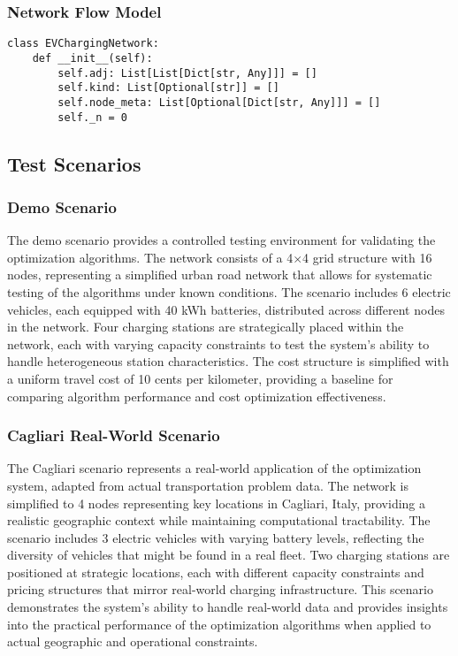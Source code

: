 \documentclass[12pt,a4paper]{article}
\begin{document}
\subsubsection{Network Flow Model}
\begin{lstlisting}[caption=Residual Network Structure]
class EVChargingNetwork:
    def __init__(self):
        self.adj: List[List[Dict[str, Any]]] = []
        self.kind: List[Optional[str]] = []
        self.node_meta: List[Optional[Dict[str, Any]]] = []
        self._n = 0
\end{lstlisting}

\subsection{Test Scenarios}

\subsubsection{Demo Scenario}

The demo scenario provides a controlled testing environment for validating the optimization algorithms. The network consists of a 4$\times$4 grid structure with 16 nodes, representing a simplified urban road network that allows for systematic testing of the algorithms under known conditions. The scenario includes 6 electric vehicles, each equipped with 40 kWh batteries, distributed across different nodes in the network. Four charging stations are strategically placed within the network, each with varying capacity constraints to test the system's ability to handle heterogeneous station characteristics. The cost structure is simplified with a uniform travel cost of 10 cents per kilometer, providing a baseline for comparing algorithm performance and cost optimization effectiveness.

\subsubsection{Cagliari Real-World Scenario}

The Cagliari scenario represents a real-world application of the optimization system, adapted from actual transportation problem data. The network is simplified to 4 nodes representing key locations in Cagliari, Italy, providing a realistic geographic context while maintaining computational tractability. The scenario includes 3 electric vehicles with varying battery levels, reflecting the diversity of vehicles that might be found in a real fleet. Two charging stations are positioned at strategic locations, each with different capacity constraints and pricing structures that mirror real-world charging infrastructure. This scenario demonstrates the system's ability to handle real-world data and provides insights into the practical performance of the optimization algorithms when applied to actual geographic and operational constraints.
\end{document}
